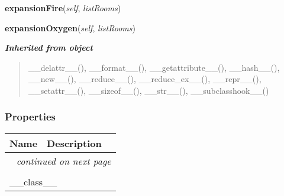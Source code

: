     \label{room:Room:expansionFire}

    \vspace{0.5ex}

\hspace{.8\funcindent}\begin{boxedminipage}{\funcwidth}

    \raggedright \textbf{expansionFire}(\textit{self}, \textit{listRooms})

\setlength{\parskip}{2ex}
\setlength{\parskip}{1ex}
    \end{boxedminipage}

    \label{room:Room:expansionOxygen}

    \vspace{0.5ex}

\hspace{.8\funcindent}\begin{boxedminipage}{\funcwidth}

    \raggedright \textbf{expansionOxygen}(\textit{self}, \textit{listRooms})

\setlength{\parskip}{2ex}
\setlength{\parskip}{1ex}
    \end{boxedminipage}


\large{\textbf{\textit{Inherited from object}}}

\begin{quote}
\_\_delattr\_\_(), \_\_format\_\_(), \_\_getattribute\_\_(), \_\_hash\_\_(), \_\_new\_\_(), \_\_reduce\_\_(), \_\_reduce\_ex\_\_(), \_\_repr\_\_(), \_\_setattr\_\_(), \_\_sizeof\_\_(), \_\_str\_\_(), \_\_subclasshook\_\_()
\end{quote}


  \subsubsection{Properties}

    \vspace{-1cm}
\hspace{\varindent}\begin{longtable}{|p{\varnamewidth}|p{\vardescrwidth}|l}
\cline{1-2}
\cline{1-2} \centering \textbf{Name} & \centering \textbf{Description}& \\
\cline{1-2}
\endhead\cline{1-2}\multicolumn{3}{r}{\small\textit{continued on next page}}\\\endfoot\cline{1-2}
\endlastfoot\multicolumn{2}{|l|}{\textit{Inherited from object}}\\
\multicolumn{2}{|p{\varwidth}|}{\raggedright \_\_class\_\_}\\
\cline{1-2}
\end{longtable}

